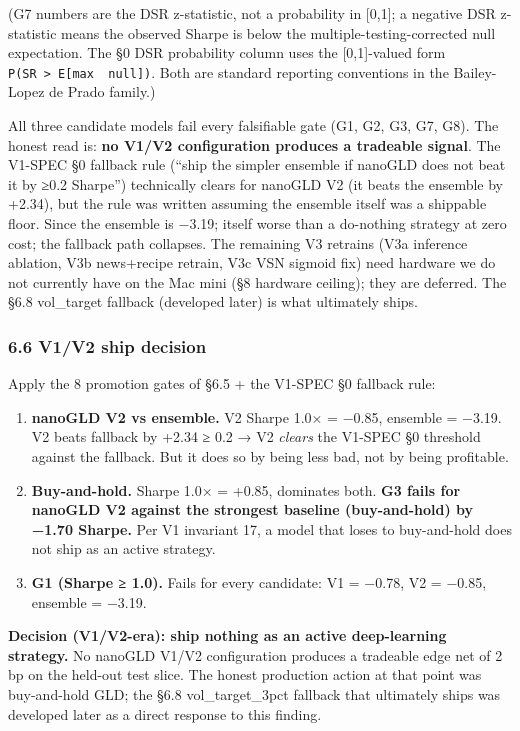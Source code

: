 \documentclass[
]{article}
\providecommand{\tightlist}{%
  \setlength{\itemsep}{0pt}\setlength{\parskip}{0pt}}
\begin{document}
(G7 numbers are the DSR z-statistic, not a probability in {[}0,1{]}; a
negative DSR z-statistic means the observed Sharpe is below the
multiple-testing-corrected null expectation. The §0 DSR probability
column uses the {[}0,1{]}-valued form
\texttt{P(SR\ \textgreater{}\ E{[}max\ \textbar{}\ null{]})}. Both are
standard reporting conventions in the Bailey-Lopez de Prado family.)

All three candidate models fail every falsifiable gate (G1, G2, G3, G7,
G8). The honest read is: \textbf{no V1/V2 configuration produces a
tradeable signal}. The V1-SPEC §0 fallback rule (``ship the simpler
ensemble if nanoGLD does not beat it by ≥0.2 Sharpe'') technically
clears for nanoGLD V2 (it beats the ensemble by +2.34), but the rule was
written assuming the ensemble itself was a shippable floor. Since the
ensemble is −3.19; itself worse than a do-nothing strategy at zero cost;
the fallback path collapses. The remaining V3 retrains (V3a inference
ablation, V3b news+recipe retrain, V3c VSN sigmoid fix) need hardware we
do not currently have on the Mac mini (§8 hardware ceiling); they are
deferred. The §6.8 vol\_target fallback (developed later) is what
ultimately ships.

\subsubsection{6.6 V1/V2 ship decision}\label{v1v2-ship-decision}

Apply the 8 promotion gates of §6.5 + the V1-SPEC §0 fallback rule:

\begin{enumerate}
\def\labelenumi{\arabic{enumi}.}
\tightlist
\item
  \textbf{nanoGLD V2 vs ensemble.} V2 Sharpe 1.0× = −0.85, ensemble =
  −3.19. V2 beats fallback by +2.34 ≥ 0.2 → V2 \emph{clears} the V1-SPEC
  §0 threshold against the fallback. But it does so by being less bad,
  not by being profitable.
\item
  \textbf{Buy-and-hold.} Sharpe 1.0× = +0.85, dominates both. \textbf{G3
  fails for nanoGLD V2 against the strongest baseline (buy-and-hold) by
  −1.70 Sharpe.} Per V1 invariant 17, a model that loses to buy-and-hold
  does not ship as an active strategy.
\item
  \textbf{G1 (Sharpe ≥ 1.0).} Fails for every candidate: V1 = −0.78, V2
  = −0.85, ensemble = −3.19.
\end{enumerate}

\textbf{Decision (V1/V2-era): ship nothing as an active deep-learning
strategy.} No nanoGLD V1/V2 configuration produces a tradeable edge net
of 2 bp on the held-out test slice. The honest production action at that
point was buy-and-hold GLD; the §6.8 vol\_target\_3pct fallback that
ultimately ships was developed later as a direct response to this
finding.
\end{document}
